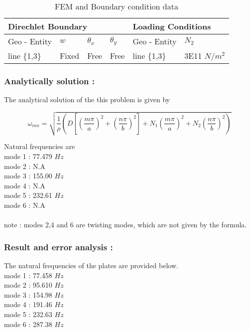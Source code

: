 \documentclass[VM.tex]{subfiles}
\begin{document}
\begin{table}[h!]
\renewcommand{\arraystretch}{1.5}
\centering
\caption{FEM and Boundary condition data}
\label{my-label}
\begin{tabular}{|l|lll|l|l|}
\hline
 \multicolumn{4}{l|}{\cellcolor[HTML]{C0C0C0}Direchlet Boundary} & \multicolumn{2}{l|}{\cellcolor[HTML]{C0C0C0}Loading Conditions} \\ \hline \hline
Geo - \newline Entity      & $w$          & $\theta _ x$     & $\theta _ y $    & Geo - \newline Entity         & $N_2$         \\    \hline
                 line \{1,3\}                   & Fixed      & Free         & Free        & line \{1,3\}                   & 3E11 $N/m^2$       

 \\ \hline
\end{tabular}
\end{table}
\subsubsection*{Analytically solution : }
The analytical solution of the this problem is given by 

\begin{equation}
\omega_{mn}=  \sqrt{ \frac{1}{\rho} \left( D  \left[ \left( \frac{m\pi}{a} \right)^2 + \left( \frac{n\pi}{b} \right)^2 \right] + N_1 \left( \frac{m\pi}{a} \right)^2 +N_2 \left( \frac{n\pi}{b} \right)^2 \right) }
\end{equation}

Natural frequencies are \\
mode 1 : 77.479 $Hz$ \\
mode 2 : N.A \\
mode 3 : 155.00 $Hz$ \\
mode 4 : N.A \\
mode 5 : 232.61 $Hz$ \\
mode 6 : N.A \\ \\
note : modes 2,4 and 6 are twisting modes, which are not given by the formula.
 

\subsubsection*{Result and error analysis : }


The natural frequencies of the plates are provided below.\\
mode 1 : 77.458 $Hz$ \\
mode 2 : 95.610 $Hz$ \\
mode 3 : 154.98 $Hz$ \\
mode 4 : 191.46 $Hz$ \\
mode 5 : 232.63 $Hz$ \\
mode 6 : 287.38 $Hz$ \\ 
\end{document}
